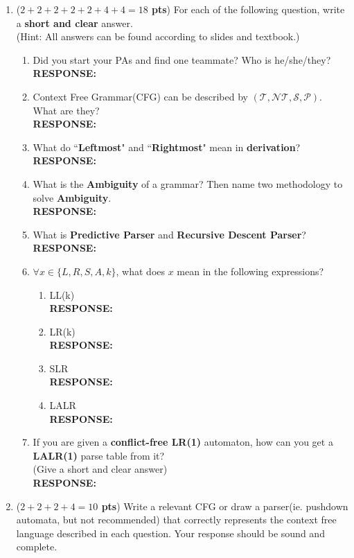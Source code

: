\documentclass[10pt]{article}
\newcommand {\pts}[1]{({\bf #1 pts})}
\newcommand {\response}{{\color{blue}\textbf{RESPONSE:}\\}}
\begin{document}
\newpage
\begin{enumerate}
	\item \pts{$2 +2 +2+2+2 + 4 + 4 =18$} For each of the following question, write a \textbf{short and clear} answer.\\
	    (Hint: All answers can be found according to slides and textbook.)
	      \begin{enumerate}
	        \item Did you start your PAs and find one teammate? Who is he/she/they?\\\response
	        \item Context Free Grammar(CFG) can be described by $(\mathcal{T},\mathcal{NT},\mathcal{S},\mathcal{P})$. What are they? \\\response
	      	\item What do ``\textbf{Leftmost}" and ``\textbf{Rightmost}" mean in \textbf{derivation}?\\\response
	      	\item What is the \textbf{Ambiguity} of a grammar? Then name two methodology to solve \textbf{Ambiguity}.\\\response
	      	\item What is \textbf{Predictive Parser} and \textbf{Recursive Descent Parser}?   \\\response
	      	\item $\forall x \in \{L,R,S,A,k\}$, what does $x$ mean in the following expressions?\\
	      	\begin{enumerate}
	      	    \item LL(k) \\\response 
	      	    \item LR(k) \\\response
	      	    \item SLR   \\\response
	      	    \item LALR  \\\response
	      	\end{enumerate}
	      	\item If you are given a \textbf{conflict-free LR(1)} automaton, how can you get a \textbf{LALR(1)} parse table from it? \\(Give a short and clear answer) \\\response
	      \end{enumerate}
	\item \pts{$2+2+2+4=10$} Write a relevant CFG or draw a parser(ie. pushdown automata, but not recommended) that correctly represents the context free language described in each question. Your response should be sound and complete.

\end{enumerate}
\end{document}
